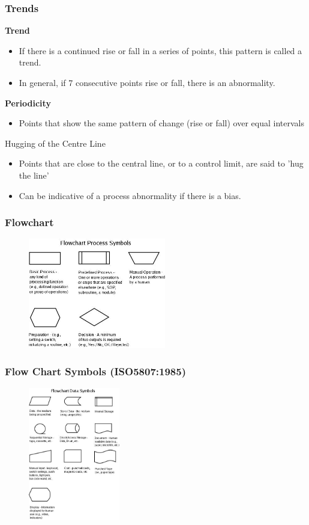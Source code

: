 \begin{frame}
\frametitle{Trends}
\textbf{Trend}
\begin{itemize}
	\item If there is a continued rise or fall in a series of points, this pattern is called a trend.
	\item In general, if 7 consecutive points rise or fall, there is an abnormality.
\end{itemize}
\textbf{Periodicity}
\begin{itemize}
	\item Points that show the same pattern of change (rise or fall) over equal intervals
\end{itemize}
Hugging of the Centre Line
\begin{itemize}
	\item Points that are close to the central line, or to a control limit, are said to 'hug the line'
	\item Can be indicative of a process abnormality if there is a bias.
\end{itemize}
\end{frame}




\begin{frame}
\frametitle{Flowchart}
\begin{figure}
	\centering
		\includegraphics[width = 6cm]{images/flow1.jpg}
	\label{fig:flow1}
\end{figure}
\end{frame}




\begin{frame}
\frametitle{Flow Chart Symbols  (ISO5807:1985) }
\begin{figure}
	\centering
		\includegraphics[width = 4cm]{images/flow2.jpg}
	\label{fig:flow2}
\end{figure}

\end{frame}




